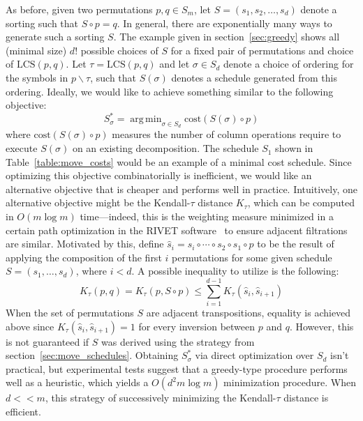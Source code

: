 \documentclass{siamart190516}
\DeclareMathOperator*{\argmin}{arg\,min}
\begin{document}
As before, given two permutations $p, q \in S_m$, let $S = ( s_1, s_2, \dots, s_d )$ denote a sorting such that $S \circ p = q$. 
In general, there are exponentially many ways to generate such a sorting $S$. 
The example given in section~\ref{sec:greedy} shows all (minimal size) $d!$ possible choices of $S$ for a fixed pair of permutations and choice of $\mathrm{LCS}(p,q)$. 
Let $\tau = \mathrm{LCS}(p,q)$ and let $\sigma \in S_d$ denote a choice of ordering   for the symbols in  $p \smallsetminus \tau$, 
such that $S(\sigma)$ denotes a schedule generated from this ordering. Ideally, we would like to achieve something similar to the following objective: 
\begin{equation}\label{eq:schedule_opt}
	S_\sigma^\ast = \argmin_{\sigma \in S_d} \mathrm{cost}(S(\sigma) \circ p)
\end{equation}
where $\mathrm{cost}(S(\sigma) \circ p)$ measures the number of column operations require to execute $S(\sigma)$ on an existing decomposition. 
The schedule $S_1$ shown in Table~\ref{table:move_costs} would be an example of a minimal cost schedule. Since optimizing this objective combinatorially is inefficient, we would like an alternative objective that is cheaper and performs well in practice. 
Intuitively, one alternative objective might be the Kendall-$\tau$ distance $K_\tau$, 
which can be computed in $O(m \log m)$ time---indeed, this is the weighting measure minimized in a certain path optimization in the RIVET software~\cite{lesnick2015interactive} to ensure adjacent filtrations are similar. Motivated by this, define $\hat{s}_i =  s_i \circ \cdots \circ s_2 \circ s_1 \circ p$ to be the result of applying the composition of the first $i$ permutations for some given schedule $S = (s_1, \dots, s_d)$, where $i < d$. 
A possible inequality to utilize is the following: 
\begin{equation}\label{eq:kendall_inequality}
K_\tau(p, q) = K_{\tau}(p, S \circ p) \leq \sum\limits_{i=1}^{d-1} K_{\tau}(\hat{s}_i, \hat{s}_{i+1})
\end{equation}
When the set of permutations $S$ are adjacent transpositions, equality is achieved above since $K_\tau(\hat{s}_i, \hat{s}_{i+1}) = 1$ for every inversion between $p$ and $q$. However, this is not guaranteed if $S$ was derived using the strategy from section~\ref{sec:move_schedules}. Obtaining $S_\sigma^\ast$ via direct optimization over $S_d$ isn't practical, but experimental tests suggest that a greedy-type procedure performs well as a heuristic, which yields a $O(d^2 m \log m)$ minimization procedure. When $d <<  m$, this strategy of successively minimizing the Kendall-$\tau$ distance is efficient. 
\end{document}
